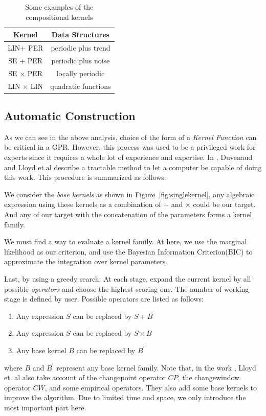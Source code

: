 \begin{table}[htp]
\centering
{\small
\begin{tabular}{c|c}
    \hline
    \textbf{Kernel} & \textbf{Data Structures} \\ 
    \hline
	   LIN+ PER & periodic plus trend\\
	   SE + PER & periodic plus noise\\
	   SE $\times$ PER & locally periodic\\
	   LIN $\times$ LIN & quadratic functions\\
	   \hline
\end{tabular}
}
\vspace{-0.1in}
\caption{Some examples of the compositional kernels}
\label{tab:compKernel}
\end{table}


\subsection{Automatic Construction}
As we can see in the above analysis, choice of the form of a \emph{Kernel Function} can be critical in a GPR. However, this process was used to be a privileged work for experts since it requires a whole lot of experience and expertise. In \cite{duvenaud2013structure,lloyd2014automatic,duvenaud2014automatic}, Duvenaud and Lloyd et.al describe a tractable method to let a computer be capable of doing this work.
This procedure is summarized as follows:

We consider the \emph{base kernels} as shown in Figure~\ref{fig:singlekernel}, any algebraic expression using these kernels as a combination of $+$ and $\times$ could be our target. And any of our target with the concatenation of the parameters forms a kernel family.

We must find a way to evaluate a kernel family. At here, we use the marginal likelihood\cite{blumer1987occam} as our criterion, and use the Bayesian Information Criterion(BIC)\cite{schwarz1978estimating} to approximate the integration over kernel parameters.

Last, by using a greedy search: At each stage, expand the current kernel by all possible \emph{operators}
and choose the highest scoring one. The number of working stage is defined by user.
Possible operators are listed as follows:
\begin{enumerate}
	\item Any expression $S$ can be replaced by $S + B$
	\item Any expression $S$ can be replaced by $S \times B$
	\item Any base kernel $B$ can be replaced by $B^{'}$
\end{enumerate}
where $B$ and $B^{'}$ represent any base kernel family. Note that, in the work \cite{lloyd2014automatic}, Lloyd et. al also take account of the changepoint operator $CP$, the changewindow operator $CW$, and some empirical operators. They also add some base kernels to improve the algorithm. Due to limited time and space, we only introduce the most important part here.

